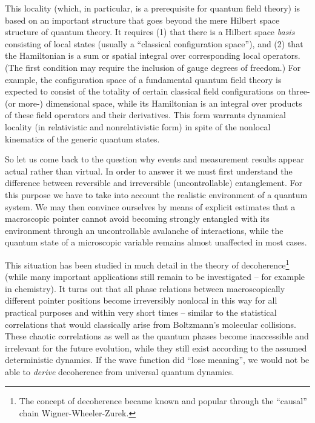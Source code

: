 This locality (which, in particular, is a prerequisite for quantum
field theory) is based on an important structure that goes beyond the
mere Hilbert space structure of quantum theory. It requires (1) that
there is a Hilbert space {\it basis} consisting of local states
(usually a ``classical configuration space''), and (2) that the
Hamiltonian is a sum or spatial integral over corresponding local
operators. (The first condition may require the inclusion of gauge
degrees of freedom.) For example, the configuration space of a
fundamental quantum field theory is expected to consist of the
totality of certain classical field configurations on three- (or
more-) dimensional space, while its Hamiltonian is an integral over
products of these field operators and their derivatives. This form
warrants dynamical locality (in relativistic and nonrelativistic form)
in spite of the nonlocal kinematics of the generic quantum states.

So let us come back to the question why events and measurement results
appear actual rather than virtual. In order to answer it we
must first understand the difference between reversible and
irreversible (uncontrollable) entanglement. For this purpose we have
to take into account the realistic environment of a quantum system.
We may then convince ourselves by means of explicit estimates that a
macroscopic pointer cannot avoid becoming strongly entangled with its
environment through an uncontrollable avalanche of interactions, while
the quantum state of a microscopic variable remains almost
unaffected in most cases.

This situation has been
studied in much detail in the theory of decoher\-ence\footnote{The
concept of decoherence became known and popular through the ``causal''
chain Wigner-Wheeler-Zurek.} \cite{Giulini,
Zurek2001} (while many important applications still  remain to be
investigated -- for example in chemistry).  It turns out that all phase
relations between macroscopically different pointer positions become
irreversibly nonlocal in this way for all practical purposes and within
very short times -- similar to the statistical correlations that would
classically arise from Boltzmann's molecular collisions.
These chaotic correlations as well as the quantum
phases become inaccessible and irrelevant for the future evolution,
while they still exist according to the assumed deterministic
dynamics. If the wave function did ``lose meaning'', we would not
be able to {\it derive} decoherence from universal quantum dynamics.
 

